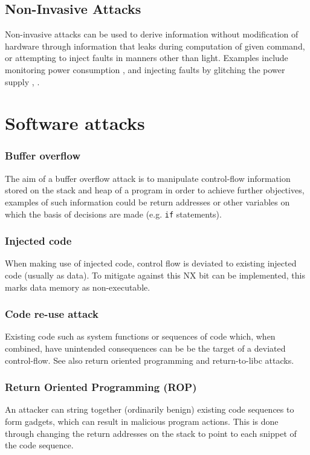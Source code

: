 \subsection{Non-Invasive Attacks}
Non-invasive attacks can be used to derive information without modification of hardware through information that leaks during computation of given command, or attempting to inject faults in manners other than light. Examples include monitoring power consumption \cite{Maurer1999}, \cite{MangardStefan2007Paa:} and injecting faults by glitching the power supply \cite{Anderson1996}, \cite{Bar-el2006}.

\section{Software attacks}
\subsubsection{Buffer overflow}

The aim of a buffer overflow attack is to manipulate control-flow information stored on the stack and heap of a program in order to achieve further objectives, examples of such information could be return addresses or other variables on which the basis of decisions are made (e.g. \verb|if| statements).

\subsubsection{Injected code}

When making use of injected code, control flow is deviated to existing injected code (usually as data). To mitigate against this NX bit can be implemented, this marks data memory as non-executable.

\subsubsection{Code re-use attack}
Existing code such as system functions or sequences of code which, when combined, have unintended consequences can be be the target of a deviated control-flow. See also return oriented programming and return-to-libc attacks.

\subsubsection{Return Oriented Programming (ROP)}
An attacker can string together (ordinarily benign) existing code sequences to form gadgets, which can result in malicious program actions. This is done through changing the return addresses on the stack to point to each snippet of the code sequence.

